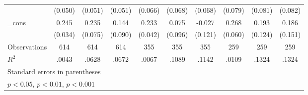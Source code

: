 {\begin{tabular}{l*{9}{c}}
            &     (0.050)         &     (0.051)         &     (0.051)         &     (0.066)         &     (0.068)         &     (0.068)         &     (0.079)         &     (0.081)         &     (0.082)         \\
[1em]
\_cons      &       0.245\sym{***}&       0.235\sym{**} &       0.144         &       0.233\sym{***}&       0.075         &      -0.027         &       0.268\sym{***}&       0.193         &       0.186         \\
            &     (0.034)         &     (0.075)         &     (0.090)         &     (0.042)         &     (0.096)         &     (0.121)         &     (0.060)         &     (0.124)         &     (0.151)         \\
\hline
Observations&         614         &         614         &         614         &         355         &         355         &         355         &         259         &         259         &         259         \\
\(R^{2}\)   &       .0043         &       .0628         &       .0672         &       .0067         &       .1089         &       .1142         &       .0109         &       .1324         &       .1324         \\
\hline\hline
\multicolumn{10}{l}{\footnotesize Standard errors in parentheses}\\
\multicolumn{10}{l}{\footnotesize \sym{*} \(p<0.05\), \sym{**} \(p<0.01\), \sym{***} \(p<0.001\)}\\
\end{tabular}
}
